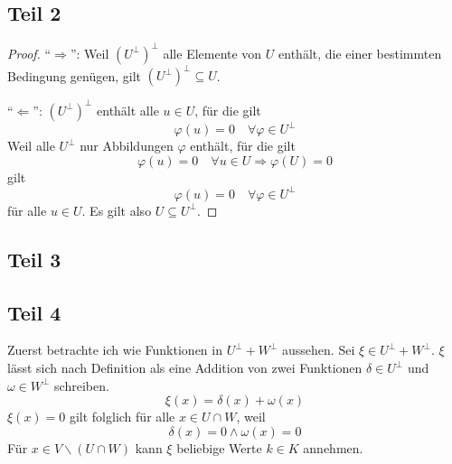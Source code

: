 \documentclass[a4paper,10pt]{article}
\begin{document}
\subsection*{Teil 2}

\begin{proof}
 ``$\Rightarrow$'': Weil $(U^\perp)^\perp$ alle Elemente von $U$ enthält, die einer bestimmten Bedingung genügen, gilt $(U^\perp)^\perp \subseteq U$.
 
 ``$\Leftarrow$'': $(U^\perp)^\perp$ enthält alle $u \in U$, für die gilt
 \begin{equation}
  \varphi(u) = 0 \quad \forall \varphi \in U^\perp
 \end{equation}
 Weil alle $U^\perp$ nur Abbildungen $\varphi$ enthält, für die gilt
 \begin{equation}
  \varphi(u) = 0 \quad \forall u \in U \Rightarrow \varphi(U) = 0
 \end{equation}
 gilt
 \begin{equation}
  \varphi(u) = 0 \quad \forall \varphi \in U^\perp
 \end{equation}
 für alle $u \in U$.
 Es gilt also $U \subseteq U^\perp$.
\end{proof}

\subsection*{Teil 3}

\subsection*{Teil 4}

Zuerst betrachte ich wie Funktionen in $U^\perp + W^\perp$ aussehen.
Sei $\xi \in U^\perp + W^\perp$.
$\xi$ lässt sich nach Definition als eine Addition von zwei Funktionen $\delta \in U^\perp$ und $\omega \in W^\perp$ schreiben.
\begin{equation}
 \xi(x) = \delta(x) + \omega(x)
\end{equation}
$\xi(x) = 0$ gilt folglich für alle $x \in U \cap W$, weil
\begin{equation}
 \delta(x) = 0 \land \omega(x) = 0
\end{equation}
Für $x \in V \backslash (U \cap W)$ kann $\xi$ beliebige Werte $k \in K$ annehmen.
\end{document}
